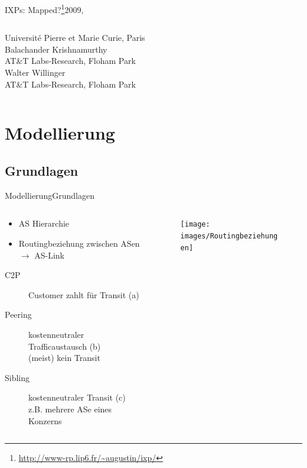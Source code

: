 \documentclass[ngerman,compress,hyperref={bookmarks}]{beamer}
\begin{document}
\begin{frame}{IXPs: Mapped?\footnote{\url{http://www-rp.lip6.fr/~augustin/ixp/}}}{2009, \cite{Augustin:2009:IM:1644893.1644934}}
\begin{columns}[c]
\begin{column}{0.3\textwidth}
{      Université Pierre et Marie Curie, Paris\\
      \vspace{0.5cm}
      Balachander Krishnamurthy\\
      \vspace{0.1cm}
      AT\&T Labs-Research, Floham Park\\
      \vspace{0.3cm}
      Walter Willinger\\
      \vspace{0.1cm}
      AT\&T Labs-Research, Floham Park\\ }
    \end{column}
  \end{columns}
\end{frame}


\section{Modellierung}

\subsection{Grundlagen}
\begin{frame}{Modellierung}{Grundlagen}
  \begin{columns}[c]
    \begin{column}{0.7\textwidth}
      \begin{itemize}
        \item AS Hierarchie
        \item Routingbeziehung zwischen ASen $\rightarrow$ AS-Link
      \end{itemize}
      \begin{description}
        \item[C2P] Customer zahlt für Transit (a)
        \item[Peering] kostenneutraler Trafficaustausch (b)\\{\scriptsize (meist) kein Transit}
        \item[Sibling] kostenneutraler Transit (c)\\{\scriptsize z.B. mehrere ASe eines Konzerns}
      \end{description}
    \end{column}
    \begin{column}{0.3\textwidth}
      \begin{figure}
        \texttt{[image: images/Routingbeziehungen]}
      \end{figure}
    \end{column}
  \end{columns}
\end{frame}
\end{document}
